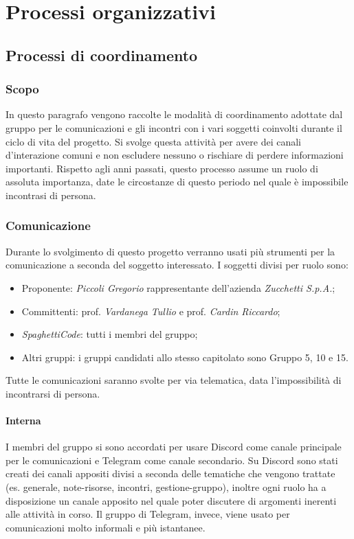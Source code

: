 \section{Processi organizzativi}
\label{sec:processi_organizativi}

\subsection{Processi di coordinamento}

\subsubsection{Scopo}
In questo paragrafo vengono raccolte le modalità di coordinamento adottate dal gruppo per le comunicazioni e gli 
incontri con i vari soggetti coinvolti durante il ciclo di vita del progetto. Si svolge questa attività per avere 
dei canali d'interazione comuni e non escludere nessuno o rischiare di perdere informazioni importanti. Rispetto 
agli anni passati, questo processo assume un ruolo di assoluta importanza, date le circostanze di questo periodo 
nel quale è impossibile incontrasi di persona.

\subsubsection{Comunicazione}
Durante lo svolgimento di questo progetto verranno usati più strumenti per la comunicazione a seconda del soggetto 
interessato. I soggetti divisi per ruolo sono:
\begin{itemize}
    \item Proponente: \emph{Piccoli Gregorio} rappresentante dell'azienda \emph{Zucchetti S.p.A.};
    \item Committenti: prof. \emph{Vardanega Tullio} e prof. \emph{Cardin Riccardo};
    \item \emph{SpaghettiCode}: tutti i membri del gruppo;
    \item Altri gruppi: i gruppi candidati allo stesso capitolato sono Gruppo 5, 10 e 15.
\end{itemize}
Tutte le comunicazioni saranno svolte per via telematica, data l'impossibilità di incontrarsi di persona.

\paragraph{Interna}

I membri del gruppo si sono accordati per usare Discord come canale principale per le comunicazioni e Telegram 
come canale secondario. Su Discord sono stati creati dei canali appositi divisi a seconda delle tematiche che 
vengono trattate (es. generale, note-risorse, incontri, gestione-gruppo), inoltre ogni ruolo ha a disposizione 
un canale apposito nel quale poter discutere di argomenti inerenti alle attività in corso. Il gruppo di 
Telegram, invece, viene usato per comunicazioni molto informali e più istantanee.

